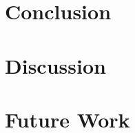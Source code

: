 \chapter{Conclusion}
\label{chap:conclusion}


\chapter{Discussion}
\label{chap:discussion}


\chapter{Future Work}
\label{chap:future-work}

